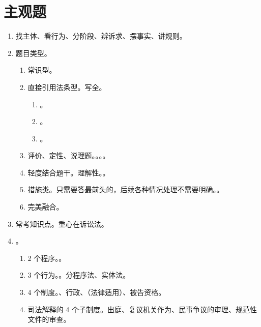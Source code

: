 \chapter{主观题}
\begin{enumerate}
  \item 找主体、看行为、分阶段、辨诉求、摆事实、讲规则。
  \item 题目类型。
        \begin{enumerate}
          \item 常识型。
          \item 直接引用法条型。写全。
                \begin{enumerate}
                  \item {}。
                  \item {}。
                  \item {}。
                \end{enumerate}
          \item 评价、定性、说理题。。。。
          \item 轻度结合题干。理解性。。
          \item 措施类。只需要答最前头的，后续各种情况处理不需要明确。。
          \item 完美融合。
        \end{enumerate}
  \item 常考知识点。重心在诉讼法。
  \item {}。
        \begin{enumerate}
          \item 2 个程序。。
          \item 3 个行为。。分程序法、实体法。
          \item 4 个制度。、行政、（法律适用）、被告资格。
          \item 司法解释的 4 个子制度。出庭、复议机关作为、民事争议的审理、规范性文件的审查。
        \end{enumerate}
\end{enumerate}
